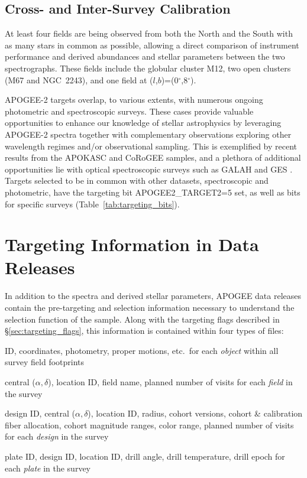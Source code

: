 \documentclass[12pt,twocolumn]{emulateapj}
\begin{document}
\subsection{Cross- and Inter-Survey Calibration}
\label{sec:calibration_surveys}

At least four fields are being observed from both the North and the South with as many stars in common as possible, allowing a direct comparison of instrument performance and derived abundances and stellar parameters between the two spectrographs.  These fields include the globular cluster M12, two open clusters (M67 and NGC~2243), and one field at ($l$,$b$)=(0$^\circ$,8$^\circ$).

APOGEE-2 targets overlap, to various extents, with numerous ongoing photometric and spectroscopic surveys.  These cases provide valuable opportunities to enhance our knowledge of stellar astrophysics by leveraging APOGEE-2 spectra together with complementary observations exploring other wavelength regimes and/or observational sampling.  This is exemplified by recent results from the APOKASC \citep{tayar_mixlen} and CoRoGEE \citep{Anders_2017_corotgee} samples, and a plethora of additional opportunities lie with optical spectroscopic surveys such as GALAH \citep{galah} and GES \citep{gilmore_ges}.  Targets selected to be in common with other datasets, spectroscopic and photometric, have the targeting bit APOGEE2\_TARGET2=5 set, as well as bits for specific surveys (Table~\ref{tab:targeting_bits}).


\section{Targeting Information in Data Releases}
\label{sec:dr_targeting_info}

In addition to the spectra and derived stellar parameters, 
APOGEE data releases contain the pre-targeting and selection information necessary to understand the selection function of the sample.
Along with the targeting flags described in \S\ref{sec:targeting_flags}, 
this information is contained within four types of files:
\begin{description} \itemsep -2pt
\item[apogee2Object] ID, coordinates, photometry, proper motions, etc.\ for each {\it object} within all survey field footprints
\item[apogee2Field] central ($\alpha, \delta$), location ID, field name, planned number of visits for each {\it field} in the survey
\item[apogee2Design] design ID, central ($\alpha, \delta$), location ID, radius, cohort versions, cohort \& calibration fiber allocation, cohort magnitude ranges, color range, planned number of visits for each {\it design} in the survey
\item[apogee2Plate] plate ID, design ID, location ID, drill angle, drill temperature, drill epoch for each {\it plate} in the survey
\end{description}
\end{document}
